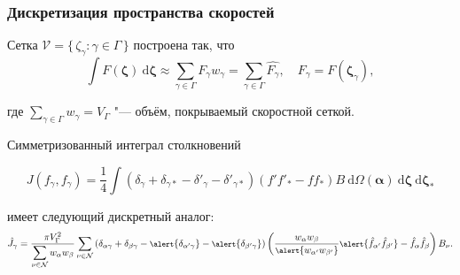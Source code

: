 \documentclass[mathserif]{beamer} %
\newcommand{\dd}{\:\mathrm{d}}
\newcommand{\dzeta}{\boldsymbol{\dd\zeta}}
\newcommand{\bzeta}{\boldsymbol{\zeta}}
\newcommand{\Nu}{\mathcal{N}}
\newcommand{\Set}[2]{\{\,{#1}:{#2}\,\}}
\begin{document}
\begin{frame}
    \frametitle{Дискретизация пространства скоростей}
    Сетка \(\mathcal{V} = \Set{\zeta_\gamma}{\gamma\in\Gamma}\) построена так, что
    \begin{equation}\label{eq:zeta_cubature}
        \int F(\bzeta) \dzeta \approx \sum_{\gamma\in\Gamma} F_\gamma w_\gamma =
            \sum_{\gamma\in\Gamma} \hat{F_\gamma},
            \quad F_\gamma = F(\bzeta_\gamma),
    \end{equation}\vspace{-10pt}

    где \(\sum_{\gamma\in\Gamma} w_\gamma = V_\Gamma\) "--- объём, покрываемый скоростной сеткой.
    \pause\vspace{20pt}

    Симметризованный интеграл столкновений\vspace{-20pt}

    \begin{equation}\label{eq:symm_ci}
        J(f_\gamma, f_\gamma) = \frac14\int \left(
            \delta_\gamma + \delta_{\gamma*} - \delta'_\gamma - \delta'_{\gamma*}
        \right) (f'f'_* - ff_*)B \dd\Omega(\boldsymbol{\alpha}) \dzeta\dzeta_*
    \end{equation}\vspace{-30pt}

    имеет следующий дискретный аналог:
    \begin{equation}\label{eq:discrete_symm_ci}
        \footnotesize
        \hat{J}_\gamma = \frac{\pi V_\Gamma^2}{\displaystyle\sum_{\nu\in\Nu} w_{\alpha}w_{\beta}}
            \sum_{\nu\in\Nu} \left(
                \delta_{\alpha\gamma} + \delta_{\beta\gamma} - \alert{\delta_{\alpha'\gamma}} - \alert{\delta_{\beta'\gamma}}
            \right)\left(
                \frac{w_{\alpha}w_{\beta}}{\alert{w_{\alpha'}w_{\beta'}}}
                \alert{\hat{f}_{\alpha'}\hat{f}_{\beta'}} - \hat{f}_{\alpha}\hat{f}_{\beta}
            \right)B_\nu.
    \end{equation}\vspace{-10pt}
\end{frame}
\end{document}
